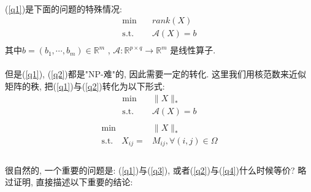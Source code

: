 \documentclass[a4paper, UTF8]{ctexart}				%
\numberwithin{equation}{section}				%
\newcommand{\upcite}[1]{\textsuperscript{\textsuperscript{\cite{#1}}}}
\begin{document}
			\paragraph{}
				\quad (\ref{q1})是下面的问题的特殊情况:
				\begin{equation}
					\begin{split}\label{q2}
						\min \quad
							& rank(X)\\
						\text{s.t.} \quad
							& \mathcal{A}(X)=b\\
					\end{split}
				\end{equation}
				其中$b = (b_1, \cdots, b_m) \in \mathbb{R}^{m}$ ,
				$\mathcal{A}: \mathbb{R}^{p \times q} \rightarrow \mathbb{R}^{m}$ 是线性算子.

			\paragraph{}
				\quad 但是(\ref{q1}), (\ref{q2})都是"NP-难"的\upcite{natarajan1995sparse}, 因此需要一定的转化. 这里我们用核范数来近似矩阵的秩, 把(\ref{q1})与(\ref{q2})转化为以下形式:
				\begin{equation}
                    \begin{split}\label{q3}
                        \min \quad
                            & \lVert{X}\rVert_*\\
                        \text{s.t.} \quad
                            & \mathcal{A}(X) = b\\	
                    \end{split}
                \end{equation}
                \begin{equation}
                    \begin{split}\label{q4}
                        \min \quad
                            & \lVert{X}\rVert_*\\
                        \text{s.t.} \quad
                            X_{ij} = &M_{ij}, \forall(i,j)\in\Omega\\
                    \end{split}
                \end{equation}

			\paragraph{}
				\quad 很自然的, 一个重要的问题是: (\ref{q1})与(\ref{q3}), 或者(\ref{q2})与(\ref{q4})什么时候等价? 略过证明, 直接描述以下重要的结论:
\end{document}

